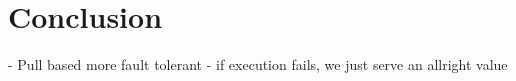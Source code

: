 \chapter{Conclusion}
\label{chapter:conclusion}

- Pull based more fault tolerant - if execution fails, we just serve an allright value


